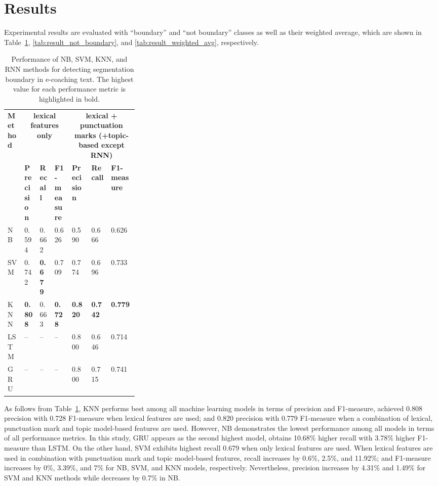 \documentclass{amia}
\begin{document}
\section*{Results}
Experimental results are evaluated with ``boundary'' and ``not boundary'' classes as well as their weighted average, which are shown in Table~\ref{tab:result_boundary}, \ref{tab:result_not_boundary}, and \ref{tab:result_weighted_avg}, respectively.\\

\begin{table}[ht]
\centering
\caption{Performance of NB, SVM, KNN, and RNN methods for detecting segmentation boundary in e-coaching text. The highest value for each performance metric is highlighted in bold.}
\label{tab:result_boundary}
  \begin{tabular}{|l|l|l|l|p{0.15\linewidth}|p{0.15\linewidth}|l|}
  \hline
   \multirow{2}{*}{\textbf{Method}} & \multicolumn{3}{|c|}{\textbf{lexical features only}} & \multicolumn{3}{|c|}{\textbf{lexical + punctuation marks (+topic-based except RNN)}} \\\cline{2-7}
   & \textbf{Precision}  & \textbf{Recall} & \textbf{F1-measure} & \textbf{Precision}  & \textbf{Recall} & \textbf{F1-measure}\\ \hline    
    
 NB & 0.594 & 0.662 & 0.626 & 0.590 & 0.666 & 0.626 \\ \hline
 SVM & 0.742 & \textbf{0.679} & 0.709 & 0.774 & 0.696 & 0.733\\ \hline
 KNN & \textbf{0.808} & 0.663 & \textbf{0.728} & \textbf{0.820} & \textbf{0.742} & \textbf{0.779}\\ \hline
 LSTM & -- & -- & -- & 0.800 & 0.646 & 0.714  \\ \hline
 GRU & -- & -- & -- & 0.800 & 0.715 & 0.741 \\ \hline 
  \end{tabular}
\end{table}                 

As follows from Table~\ref{tab:result_boundary}, KNN performs best among all machine learning models in terms of precision and F1-measure, achieved 0.808 precision with 0.728 F1-measure when lexical features are used; and 0.820 precision with 0.779 F1-measure when a combination of lexical, punctuation mark and topic model-based features are used. However, NB demonstrates the lowest performance among all models in terms of all performance metrics. In this study, GRU appears as the second highest model, obtains 10.68\% higher recall with 3.78\%  higher F1-measure than LSTM. On the other hand, SVM exhibits highest recall 0.679 when only lexical features are used. When lexical features are used in combination with punctuation mark and topic model-based features, recall increases by 0.6\%, 2.5\%, and 11.92\%; and F1-measure increases by 0\%, 3.39\%, and 7\% for NB, SVM, and KNN models, respectively. Nevertheless, precision increases by 4.31\% and 1.49\% for SVM and KNN methods while decreases by 0.7\% in NB. \\
\end{document}
